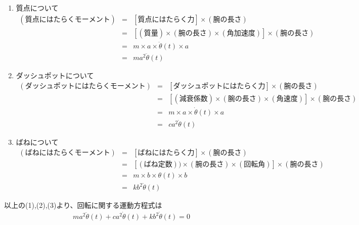 \documentclass[a4paper]{jsarticle}
\begin{document}
\begin{enumerate}[(1)]
    \item 質点について\\
          \begin{eqnarray*}
              (質点にはたらくモーメント)&=& [質点にはたらく力] \times (腕の長さ)\\
              &=& [(質量) \times (腕の長さ) \times (角加速度)] \times (腕の長さ)\\
              &=& m \times a \times \ddot{\theta}\left(t\right) \times a\\
              &=&ma^2\ddot{\theta}\left(t\right)
          \end{eqnarray*}
    \item ダッシュポットについて
          \begin{eqnarray*}
              (ダッシュポットにはたらくモーメント)&=& [ダッシュポットにはたらく力] \times (腕の長さ)\\
              &=& [(減衰係数) \times (腕の長さ) \times (角速度)] \times (腕の長さ)\\
              &=& m \times a \times \dot{\theta}\left(t\right) \times a\\
              &=&ca^2\dot{\theta}\left(t\right)
          \end{eqnarray*}
    \item ばねについて
          \begin{eqnarray*}
              (ばねにはたらくモーメント)&=& [ばねにはたらく力] \times (腕の長さ)\\
              &=& [(ばね定数)) \times (腕の長さ) \times (回転角)] \times (腕の長さ)\\
              &=& m \times b \times \theta\left(t\right) \times b\\
              &=&kb^2\dot{\theta}\left(t\right)
          \end{eqnarray*}
\end{enumerate}
以上の(1),(2),(3)より、回転に関する運動方程式は
\begin{eqnarray*}
    ma^2\ddot{\theta}\left(t\right)+ca^2\dot{\theta}\left(t\right)+kb^2\dot{\theta}\left(t\right)=0\\
\end{eqnarray*}
\end{document}
